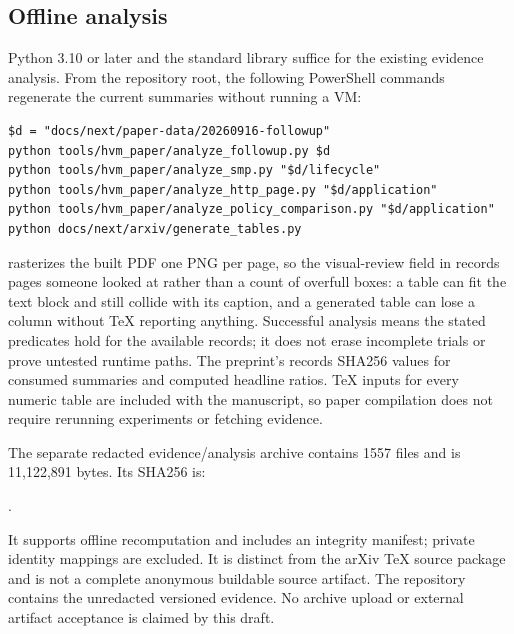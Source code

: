 \subsection{Offline analysis}
Python 3.10 or later and the standard library suffice for the existing evidence
analysis. From the repository root, the following PowerShell commands regenerate
the current summaries without running a VM:
\begin{center}\begin{minipage}{\linewidth}
\begin{verbatim}
$d = "docs/next/paper-data/20260916-followup"
python tools/hvm_paper/analyze_followup.py $d
python tools/hvm_paper/analyze_smp.py "$d/lifecycle"
python tools/hvm_paper/analyze_http_page.py "$d/application"
python tools/hvm_paper/analyze_policy_comparison.py "$d/application"
python docs/next/arxiv/generate_tables.py
\end{verbatim}
\end{minipage}\end{center}
 rasterizes the built PDF one PNG per page,
so the visual-review field in  records pages someone
looked at rather than a count of overfull boxes: a table can fit the text block
and still collide with its caption, and a generated table can lose a column
without \TeX{} reporting anything.
Successful analysis means the stated predicates hold for the available records;
it does not erase incomplete trials or prove untested runtime paths. The
preprint's  records SHA256 values for consumed
summaries and computed headline ratios. TeX inputs for every numeric table are
included with the manuscript, so paper compilation does not require rerunning
experiments or fetching evidence.

\begin{samepage}
The separate redacted evidence/analysis archive contains 1557 files and is
11,122,891 bytes. Its SHA256 is:
\begin{center}\footnotesize
{}.
\end{center}
\end{samepage}
It supports offline recomputation and includes an integrity manifest; private
identity mappings are excluded. It is distinct from the arXiv TeX source
package and is not a complete anonymous buildable source artifact. The
repository contains the unredacted versioned evidence. No archive upload or
external artifact acceptance is claimed by this draft.

